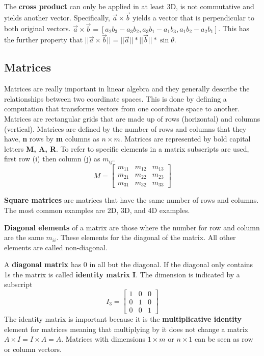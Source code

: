 \documentclass[a4paper,11pt]{amsart}
\begin{document}
The \textbf{cross product} can only be applied in at least 3D, is not 
commutative and yields another vector. Specifically, $\vec a \times \vec b$ 
yields a vector that is perpendicular to both original vectors. $\vec a \times 
\vec b = [a_2b_3-a_3b_2, a_3b_1-a_1b_3,a_1b_2-a_2b_1]$. This has the further
property that $||\vec a \times \vec b|| = ||\vec a||*||\vec b||*\sin{\theta}$.

\subsection{Matrices}

Matrices are really important in linear algebra and they generally describe the
relationships between two coordinate spaces. This is done by defining
a computation that transforms vectors from one coordinate space to another.
Matrices are rectangular grids that are made up of rows (horizontal) and
columns (vertical). Matrices are defined by the number of rows and columns that
they have, \textbf{n} rows by \textbf{m} columns as $n \times m$. Matrices are
represented by bold capital letters \textbf{M, A, R}. To refer to specific
elements in a matrix subscripts are used, first row (i) then column (j) as
$m_{ij}$.
\begin{equation}
    M = 
    \begin{bmatrix}\nonumber
        m_{11} & m_{12} & m_{13}\\
        m_{21} & m_{22} & m_{23}\\
        m_{31} & m_{32} & m_{33}
    \end{bmatrix}
\end{equation}

\textbf{Square matrices} are matrices that have the same number of rows and
columns. The most common examples are 2D, 3D, and 4D examples. 

\textbf{Diagonal elements} of a matrix are those where the number for row and
column are the same $m_{ii}$. These elements for the diagonal of the matrix.
All other elements are called non-diagonal.

A \textbf{diagonal matrix} has 0 in all but the diagonal. If the diagonal only
contains 1s the matrix is called \textbf{identity matrix} \textbf{I}. The
dimension is indicated by a subscript
\begin{equation}
    I_{3} = 
    \begin{bmatrix}\nonumber
        1 & 0 & 0\\
        0 & 1 & 0\\
        0 & 0 & 1
    \end{bmatrix}
\end{equation}
The identity matrix is important because it is the \textbf{multiplicative
identity} element for matrices meaning that multiplying by it does not change
a matrix $A \times I = I \times A = A$. Matrices with dimensions $1 \times m$ or 
$n \times 1$ can be seen as row or column vectors.
\end{document}
